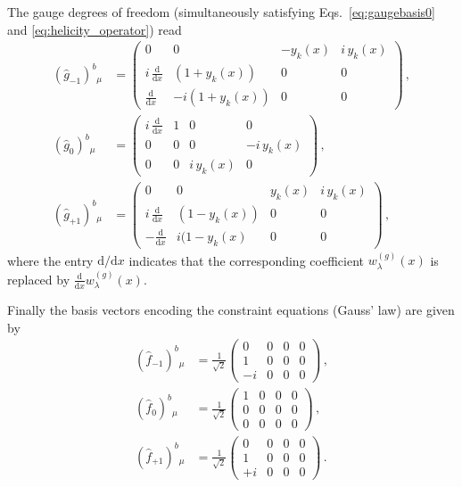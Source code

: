 The gauge degrees of freedom (simultaneously satisfying Eqs.~\eqref{eq:gaugebasis0} and \eqref{eq:helicity_operator}) read
\begin{align*}
\left(\hat g_{-1}\right)^{b}{}_{\mu} & =\left(\begin{array}{cccc}
0 & 0 & -y_k(x) & i\,y_k(x)\\
i\,\frac{\textrm{d}}{\textrm{d}x} & (1+y_k(x)) & 0 & 0\\
\frac{\textrm{d}}{\textrm{d}x} & -i(1+y_k(x)) & 0 & 0
\end{array}\right)\,,\\
\left(\hat g_{0}\right)^{b}{}_{\mu} & =\left(\begin{array}{cccc}
i\,\frac{\textrm{d}}{\textrm{d}x} & 1 & 0 & 0\\
0 & 0 & 0 & -i\,y_k(x)\\
0 & 0 & i\,y_k(x) & 0
\end{array}\right)\,,\\
\left(\hat g_{+1}\right)^{b}{}_{\mu} & =\left(\begin{array}{cccc}
0 & 0 & y_k(x) & i\,y_k(x)\\
i\,\frac{\textrm{d}}{\textrm{d}x} & (1-y_k(x)) & 0 & 0\\
-\frac{\textrm{d}}{\textrm{d}x} & i(1-y_k(x) & 0 & 0
\end{array}\right) \,,
\end{align*}
where the entry $\textrm{d}/\textrm{d}x$ indicates that the corresponding coefficient $w_\lambda^{(g)}(x)$ is replaced by $\frac{\textrm{d}}{\textrm{d}x} w_\lambda^{(g)}(x)$. 

Finally the  basis vectors encoding the constraint equations (Gauss' law) are given by
\begin{align*}
\left(\hat f_{-1}\right)^{b}{}_{\mu} & =\frac{1}{\sqrt{2}}\left(\begin{array}{cccc}
0 & 0 & 0 & 0\\
1 & 0 & 0 & 0\\
-i & 0 & 0 & 0
\end{array}\right)\,,\\
\left(\hat f_{0}\right)^{b}{}_{\mu} & =\frac{1}{\sqrt{2}}\left(\begin{array}{cccc}
1 & 0 & 0 & 0\\
0 & 0 & 0 & 0\\
0 & 0 & 0 & 0
\end{array}\right)\,,\\
\left(\hat f_{+1}\right)^{b}{}_{\mu} & =\frac{1}{\sqrt{2}}\left(\begin{array}{cccc}
0 & 0 & 0 & 0\\
1 & 0 & 0 & 0\\
+i & 0 & 0 & 0
\end{array}\right)\,.
\end{align*}
